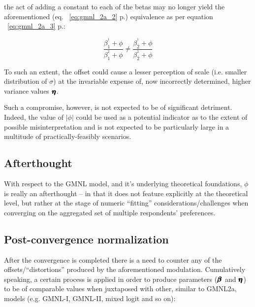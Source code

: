 \documentclass[12pt,a4paper]{article}
\begin{document}
the act of adding a constant to each of the betas may no longer yield the aforementioned (eq. ~\ref{eq:gmnl_2a_2} p.\pageref{eq:gmnl_2a_2}) equivalence as per equation ~\ref{eq:gmnl_2a_3} p.\pageref{eq:gmnl_2a_3}:

{ \Large 
\begin{equation}
\label{eq:gmnl_2a_3}
\frac{\beta^{^1}_{1} + \phi}{\beta^{^2}_{1} + \phi} \neq \frac{\beta^{^1}_{2} + \phi}{\beta^{^2}_{2} + \phi}
\end{equation}
}

To such an extent, the offset could cause a lesser perception of scale (i.e. smaller distribution of \(\sigma\)) at the invariable expense of, now incorrectly determined, higher variance values \(\pmb{\hm{\eta}}\).

Such a compromise, however, is not expected to be of significant detriment. Indeed, the value of \(\vert \phi \vert\) could be used as a potential indicator as to the extent of possible misinterpretation and is not expected to be particularly large in a multitude of practically-feasibly scenarios.

\subsection{Afterthought}

With respect to the GMNL model, and it's underlying theoretical foundations, \(\phi\) is really an afterthought -- in that it does not feature explicitly at the theoretical level, but rather at the stage of numeric ``fitting'' considerations/challenges when converging on the aggregated set of multiple respondents' preferences.

\subsection{Post-convergence normalization}

After the convergence is completed there is a need to counter any of the offsets/``distortions'' produced by the aforementioned modulation. Cumulatively speaking, a certain process is applied in order to produce parameters (\(\pmb{\hm{\beta}}\) and \(\pmb{\hm{\eta}}\)) to be of comparable values when juxtaposed with other, similar to GMNL2a, models (e.g. GMNL-I, GMNL-II, mixed logit and so on):
\end{document}
